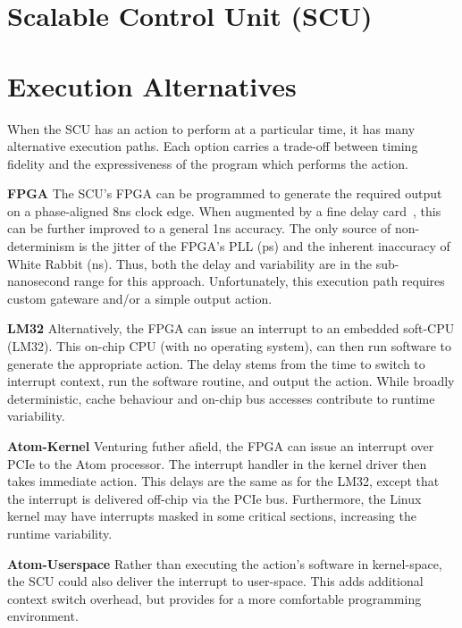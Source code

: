 \documentclass{JAC2003}
\begin{document}
\section{Scalable Control Unit (SCU)}


\section{Execution Alternatives}
When the SCU has an action to perform at a particular time, 
it has many alternative execution paths.
Each option carries a trade-off between timing fidelity and 
the expressiveness of the program which performs the action.

\textbf{FPGA} 
The SCU's FPGA can be programmed to generate the required output
on a phase-aligned 8ns clock edge. 
When augmented by a fine delay card~\cite{cern-fine-delay},
this can be further improved to a general 1ns accuracy.
The only source of non-determinism is the jitter of the FPGA's PLL (ps) 
and the inherent inaccuracy of White Rabbit (ns).
Thus, both the delay and variability are in the sub-nanosecond range 
for this approach.
Unfortunately, this execution path requires custom gateware and/or
a simple output action.

\textbf{LM32} 
Alternatively, the FPGA can issue an interrupt to an embedded soft-CPU (LM32).
This on-chip CPU (with no operating system), 
can then run software to generate the appropriate action.
The delay stems from the time to switch to interrupt context,
run the software routine,
and output the action.
While broadly deterministic,
cache behaviour and on-chip bus accesses contribute to runtime variability.

\textbf{Atom-Kernel}
Venturing futher afield,
the FPGA can issue an interrupt over PCIe to the Atom processor.
The interrupt handler in the kernel driver then takes immediate action.
This delays are the same as for the LM32, 
except that the interrupt is delivered off-chip via the PCIe bus.
Furthermore, 
the Linux kernel may have interrupts masked in some critical sections,
increasing the runtime variability.

\textbf{Atom-Userspace}
Rather than executing the action's software in kernel-space,
the SCU could also deliver the interrupt to user-space.
This adds additional context switch overhead, 
but provides for a more comfortable programming environment.
\end{document}
